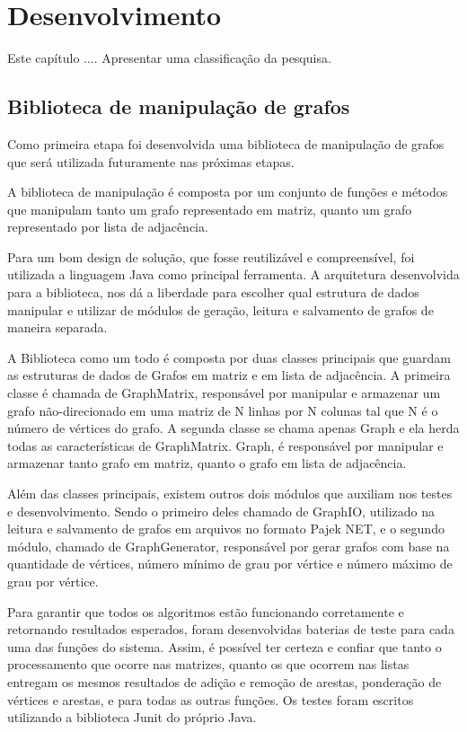 \chapter{Desenvolvimento}
\label{metodo}

Este capítulo ....
Apresentar uma classificação da pesquisa.

\section{Biblioteca de manipulação de grafos}
Como primeira etapa foi desenvolvida uma biblioteca de manipulação de grafos que será utilizada futuramente nas próximas etapas.

A biblioteca de manipulação é composta por um conjunto de funções e métodos que manipulam tanto um grafo representado em matriz, quanto um grafo representado por lista de adjacência.

Para um bom design de solução, que fosse reutilizável e compreensível, foi utilizada a linguagem Java como principal ferramenta. A arquitetura desenvolvida para a biblioteca, nos dá a liberdade para escolher qual estrutura de dados manipular e utilizar de módulos de geração, leitura e salvamento de grafos de maneira separada.

A Biblioteca como um todo é composta por duas classes principais que guardam as estruturas de dados de Grafos em matriz e em lista de adjacência. A primeira classe é chamada de GraphMatrix, responsável por manipular e armazenar um grafo não-direcionado em uma matriz de N linhas por N colunas tal que N é o número de vértices do grafo. A segunda classe se chama apenas Graph e ela herda todas as características de GraphMatrix. Graph, é responsável por manipular e armazenar tanto grafo em matriz, quanto o grafo em lista de adjacência.

Além das classes principais, existem outros dois módulos que auxiliam nos testes e desenvolvimento. Sendo o primeiro deles chamado de GraphIO, utilizado na leitura e salvamento de grafos em arquivos no formato Pajek NET, e o segundo módulo, chamado de GraphGenerator, responsável por gerar grafos com base na quantidade de vértices, número mínimo de grau por vértice e número máximo de grau por vértice.

Para garantir que todos os algoritmos estão funcionando corretamente e retornando resultados esperados, foram desenvolvidas baterias de teste para cada uma das funções do sistema. Assim, é possível ter certeza e confiar que tanto o processamento que ocorre nas matrizes, quanto os que ocorrem nas listas entregam os mesmos resultados de adição e remoção de arestas, ponderação de vértices e arestas, e para todas as outras funções. Os testes foram escritos utilizando a biblioteca Junit do próprio Java.

